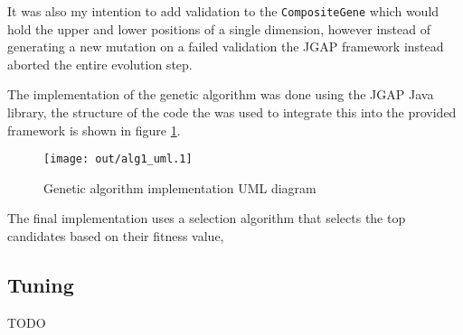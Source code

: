 \documentclass[a4paper]{article}
\begin{document}
It was also my intention to add validation to the \texttt{CompositeGene} which
would hold the upper and lower positions of a single dimension, however instead
of generating a new mutation on a failed validation the JGAP framework instead
aborted the entire evolution step.

The implementation of the genetic algorithm was done using the JGAP \cite{jgap}
Java library, the structure of the code the was used to integrate this into the
provided framework is shown in figure \ref{fig:ga_uml}.

\begin{figure}[h!]
  \centering
  \texttt{[image: out/alg1\_uml.1]}
  \caption{Genetic algorithm implementation UML diagram}
  \label{fig:ga_uml}
\end{figure}

The final implementation uses a selection algorithm that selects the top
candidates based on their fitness value, 

\subsection{Tuning}
\label{sec:ga_tuning}

TODO
\end{document}
